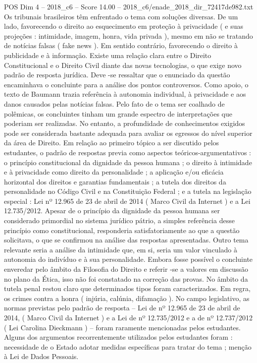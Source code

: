 \begin{textsample}{POS Dim 4 – 2018\_c6 – Score 14.00 – 2018\_c6/enade\_2018\_dir\_72417de982.txt}
Os tribunais brasileiros têm enfrentado o tema com soluções diversas.
De um lado, favorecendo o direito ao esquecimento em proteção à privacidade ( e suas projeções : intimidade, imagem, honra, vida privada ), mesmo em não se tratando de notícias falsas ( fake news ).
Em sentido contrário, favorecendo o direito à publicidade e à informação.
Existe uma relação clara entre o Direito Constitucional e o Direito Civil diante das novas tecnologias, o que exige novo padrão de resposta jurídica.
Deve -se ressaltar que o enunciado da questão encaminhava o concluinte para a análise dos pontos controversos.
Como apoio, o texto de Baumann trazia referência à autonomia individual, à privacidade e aos danos causados pelas notícias falsas.
Pelo fato de o tema ser coalhado de polêmicas, os concluintes tinham um grande espectro de interpretações que poderiam ser realizadas.
No entanto, a profundidade de conhecimentos exigidos pode ser considerada bastante adequada para avaliar os egressos do nível superior da área de Direito.
Em relação ao primeiro tópico a ser discutido pelos estudantes, o padrão de respostas previa como aspectos teóricos-argumentativos : o princípio constitucional da dignidade da pessoa humana ; o direito à intimidade e à privacidade como direito da personalidade ; a aplicação e/ou eficácia horizontal dos direitos e garantias fundamentais ; a tutela dos direitos da personalidade no Código Civil e na Constituição Federal ; e a tutela na legislação especial : Lei nº 12.965 de 23 de abril de 2014 ( Marco Civil da Internet ) e a Lei 12.735/2012.
Apesar de o princípio da dignidade da pessoa humana ser considerado primordial no sistema jurídico pátrio, a simples referência desse princípio como constitucional, responderia satisfatoriamente ao que a questão solicitava, o que se confirmou na análise das respostas apresentadas.
Outro tema relevante seria a análise da intimidade que, em si, seria um valor vinculado à autonomia do indivíduo e à sua personalidade.
Embora fosse possível o concluinte enveredar pelo âmbito da Filosofia do Direito e referir -se a valores em discussão no plano da Ética, isso não foi constatado na correção das provas.
No âmbito da tutela penal restou claro que determinados tipos foram caracterizados.
Em regra, os crimes contra a honra ( injúria, calúnia, difamação ).
No campo legislativo, as normas previstas pelo padrão de resposta – Lei de nº 12.965 de 23 de abril de 2014, ( Marco Civil da Internet ) e a Lei de nº 12.735/2012 e a de nº 12.737/2012 ( Lei Carolina Dieckmann ) – foram raramente mencionadas pelos estudantes.
Alguns dos argumentos recorrentemente utilizados pelos estudantes foram : necessidade de o Estado adotar medidas específicas para tratar do tema ; menção à Lei de Dados Pessoais.

\end{textsample}
